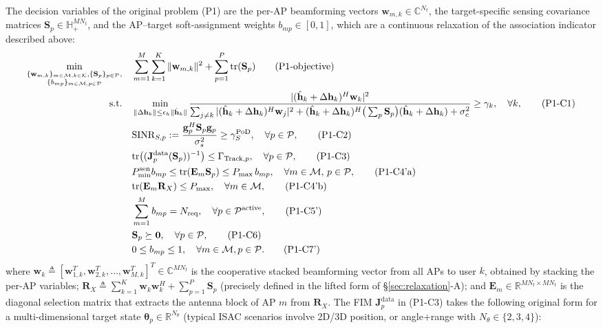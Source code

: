 \documentclass[12pt,a4paper]{article}
\newcommand{\vect}[1]{\mathbf{#1}}
\newcommand{\mat}[1]{\mathbf{#1}}
\newcommand{\tr}{\text{tr}}
\begin{document}
The decision variables of the original problem (P1) are the per-AP beamforming vectors $\vect{w}_{m,k} \in \mathbb{C}^{N_t}$, the target-specific sensing covariance matrices $\mat{S}_p\in\mathbb{H}_+^{MN_t}$, and the AP--target soft-assignment weights $b_{mp}\in[0,1]$, which are a continuous relaxation of the association indicator described above:
\begin{align}
\min_{\substack{\{\vect{w}_{m,k}\}_{m \in \mathcal{M}, k \in \mathcal{K}}, \{\mat{S}_p\}_{p \in \mathcal{P}}, \\ \{b_{mp}\}_{m \in \mathcal{M}, p \in \mathcal{P}}}} \quad
& \sum_{m=1}^{M} \sum_{k=1}^{K} \|\vect{w}_{m,k}\|^2 + \sum_{p=1}^{P} \tr(\mat{S}_p) \tag{P1-objective} \\
\text{s.t.} \quad
& \min_{\|\Delta\vect{h}_k\| \leq \epsilon_h \|\hat{\vect{h}}_k\|} \frac{|(\hat{\vect{h}}_k + \Delta\vect{h}_k)^H \vect{w}_k|^2}{\sum_{j \neq k} |(\hat{\vect{h}}_k + \Delta\vect{h}_k)^H \vect{w}_j|^2 + (\hat{\vect{h}}_k + \Delta\vect{h}_k)^H \big(\textstyle\sum_p \mat{S}_p\big) (\hat{\vect{h}}_k + \Delta\vect{h}_k) + \sigma_c^2} \geq \gamma_k, \quad \forall k, \tag{P1-C1} \\
& \text{SINR}_{S,p} := \frac{\vect{g}_p^H \mat{S}_p \vect{g}_p}{\sigma_s^2} \geq \gamma_S^{\text{PoD}}, \quad \forall p \in \mathcal{P}, \tag{P1-C2} \\
& \tr\big((\mat{J}_p^{\text{data}}(\mat{S}_p))^{-1}\big) \leq \Gamma_{\text{Track}, p}, \quad \forall p \in \mathcal{P}, \tag{P1-C3} \\
& P_{\min}^{\rm sen}b_{mp}\leq\tr(\mat{E}_m \mat{S}_p) \leq P_{\max} \, b_{mp}, \quad \forall m \in \mathcal{M}, \, p \in \mathcal{P}, \tag{P1-C4'a} \label{eq:p1c4a} \\
& \tr(\mat{E}_m \mat{R}_X) \leq P_{\max}, \quad \forall m \in \mathcal{M}, \tag{P1-C4'b} \label{eq:p1c4b} \\
& \sum_{m=1}^{M} b_{mp} = N_{\text{req}}, \quad \forall p \in \mathcal{P}^{\text{active}}, \tag{P1-C5'} \\
& \mat{S}_p \succeq \mat{0}, \quad \forall p \in \mathcal{P}, \tag{P1-C6} \\
& 0 \leq b_{mp} \leq 1, \quad \forall m \in \mathcal{M}, p \in \mathcal{P}. \tag{P1-C7'}
\end{align}
where $\vect{w}_k \triangleq [\vect{w}_{1,k}^T, \vect{w}_{2,k}^T, \ldots, \vect{w}_{M,k}^T]^T \in \mathbb{C}^{MN_t}$ is the cooperative stacked beamforming vector from all APs to user $k$, obtained by stacking the per-AP variables; $\mat{R}_X \triangleq \sum_{k=1}^{K} \vect{w}_k \vect{w}_k^H + \sum_{p=1}^{P} \mat{S}_p$ (precisely defined in the lifted form of \S\ref{sec:relaxation}-A); and $\mat{E}_m \in \mathbb{R}^{MN_t \times MN_t}$ is the diagonal selection matrix that extracts the antenna block of AP $m$ from $\mat{R}_X$. The FIM $\mat{J}_p^{\text{data}}$ in (P1-C3) takes the following original form for a multi-dimensional target state $\boldsymbol{\theta}_p \in \mathbb{R}^{N_\theta}$ (typical ISAC scenarios involve 2D/3D position, or angle+range with $N_\theta \in \{2, 3, 4\}$):
\end{document}
